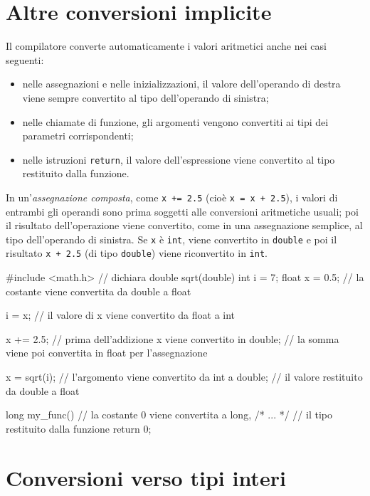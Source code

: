 \documentclass[11pt,a4paper]{article}
\begin{document}
\section{Altre conversioni implicite}

Il compilatore converte automaticamente i valori aritmetici anche nei casi seguenti:
\begin{itemize}
    \item nelle assegnazioni e nelle inizializzazioni, il valore dell'operando di destra viene sempre convertito al tipo dell'operando di sinistra;
    \item nelle chiamate di funzione, gli argomenti vengono convertiti ai tipi dei parametri corrispondenti;
    \item nelle istruzioni \lstinline|return|, il valore dell'espressione viene convertito al tipo restituito dalla funzione.
\end{itemize}

In un'\emph{assegnazione composta}, come \lstinline|x += 2.5| (cioè \lstinline|x = x + 2.5|), i valori di entrambi gli operandi sono prima soggetti alle conversioni aritmetiche usuali; poi il risultato dell'operazione viene convertito, come in una assegnazione semplice, al tipo dell'operando di sinistra. Se \lstinline|x| è \lstinline|int|, viene convertito in \lstinline|double| e poi il risultato \lstinline|x + 2.5| (di tipo \lstinline|double|) viene riconvertito in \lstinline|int|.

\begin{esempio}
\begin{codice}
#include <math.h>   // dichiara double sqrt(double)
int i = 7;
float x = 0.5;      // la costante viene convertita da double a float

i = x;              // il valore di x viene convertito da float a int

x += 2.5;           // prima dell'addizione x viene convertito in double;
                    // la somma viene poi convertita in float per l'assegnazione

x = sqrt(i);        // l'argomento viene convertito da int a double;
                    // il valore restituito da double a float

long my_func() {    // la costante 0 viene convertita a long,
    /* ... */       // il tipo restituito dalla funzione
    return 0;
}
\end{codice}
\end{esempio}

\section{Conversioni verso tipi interi}
\end{document}
